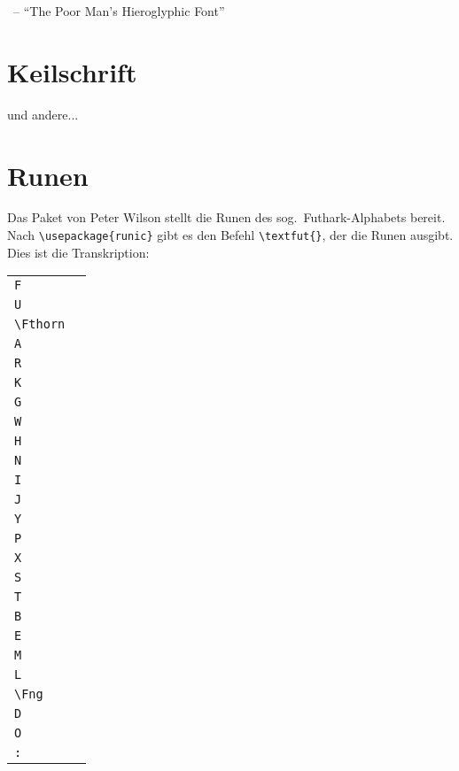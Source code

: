 ~-- \enquote{The Poor Man’s Hieroglyphic Font}




\section{Keilschrift}

 und andere...

\section{Runen}

Das Paket  von Peter Wilson stellt die Runen des sog.\ Futhark-Alphabets bereit.
Nach \lstinline/\usepackage{runic}/ gibt es den Befehl \lstinline/\textfut{}/, der
die Runen ausgibt. Dies ist die Transkription:

\begin{center}
\begin{tabular}{ll}
 \lstinline/F/ &	\textfut{F} \\
 \lstinline/U/ &	\textfut{U} \\
 \lstinline/\Fthorn/ &	\textfut{\Fthorn} \\
 \lstinline/A/ &	\textfut{A} \\
 \lstinline/R/ &	\textfut{R} \\
 \lstinline/K/ &	\textfut{K} \\
 \lstinline/G/ &	\textfut{G} \\
 \lstinline/W/ &	\textfut{W} \\
 \lstinline/H/ &	\textfut{H} \\
 \lstinline/N/ &	\textfut{N} \\
 \lstinline/I/ &	\textfut{I} \\
 \lstinline/J/ &	\textfut{J} \\
 \lstinline/Y/ &	\textfut{Y} \\
 \lstinline/P/ &	\textfut{P} \\
 \lstinline/X/ &	\textfut{X} \\
 \lstinline/S/ &	\textfut{S} \\
 \lstinline/T/ &	\textfut{T} \\
 \lstinline/B/ &	\textfut{B} \\
 \lstinline/E/ &	\textfut{E} \\
 \lstinline/M/ &	\textfut{M} \\
 \lstinline/L/ &	\textfut{L} \\
 \lstinline/\Fng/ &	\textfut{\Fng} \\
 \lstinline/D/ &	\textfut{D} \\
 \lstinline/O/ &	\textfut{O} \\
 \lstinline/:/ &	\textfut{:} \\
 \end{tabular}
 \end{center}


